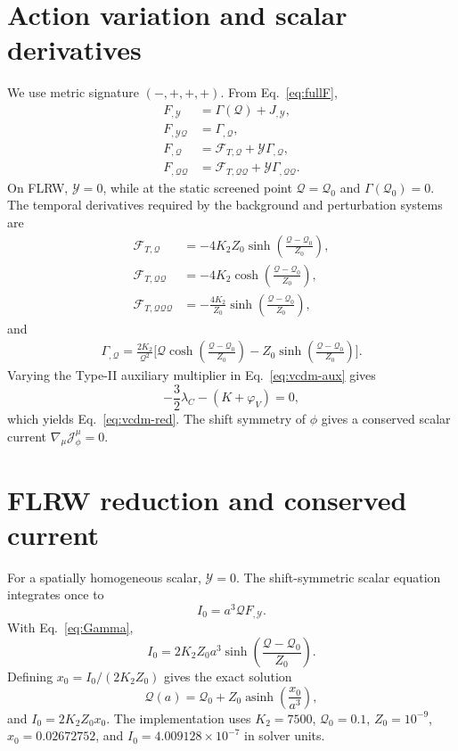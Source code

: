 \documentclass[aps,prd,twocolumn,superscriptaddress,nofootinbib,longbibliography,floatfix]{revtex4-2}
\newcommand{\Y}{\mathcal{Y}}
\newcommand{\Q}{\mathcal{Q}}
\begin{document}
\section{Action variation and scalar derivatives}\label{app:action}
We use metric signature $(-,+,+,+)$. From Eq.~\eqref{eq:fullF},
\begin{align}
F_{,\Y}&=\Gamma(\Q)+J_{,\Y},\\
F_{,\Y\Q}&=\Gamma_{,\Q},\\
F_{,\Q}&=\mathcal F_{T,\Q}+\Y\Gamma_{,\Q},\\
F_{,\Q\Q}&=\mathcal F_{T,\Q\Q}+\Y\Gamma_{,\Q\Q}.
\end{align}
On FLRW, $\Y=0$, while at the static screened point $\Q=\Q_0$ and $\Gamma(\Q_0)=0$. The temporal derivatives required by the background and perturbation systems are
\begin{align}
\mathcal F_{T,\Q}&=-4K_2Z_0\sinh\left(\frac{\Q-\Q_0}{Z_0}\right),\\
\mathcal F_{T,\Q\Q}&=-4K_2\cosh\left(\frac{\Q-\Q_0}{Z_0}\right),\\
\mathcal F_{T,\Q\Q\Q}&=-\frac{4K_2}{Z_0}\sinh\left(\frac{\Q-\Q_0}{Z_0}\right),
\end{align}
and
\begin{align}
\Gamma_{,\Q}=\frac{2K_2}{\Q^2}\Bigg[\Q\cosh\left(\frac{\Q-\Q_0}{Z_0}\right)
-Z_0\sinh\left(\frac{\Q-\Q_0}{Z_0}\right)\Bigg].
\end{align}
Varying the Type-II auxiliary multiplier in Eq.~\eqref{eq:vcdm-aux} gives
\begin{equation}
-\frac32\lambda_C-(K+\varphi_V)=0,
\end{equation}
which yields Eq.~\eqref{eq:vcdm-red}. The shift symmetry of $\phi$ gives a conserved scalar current $\nabla_\mu\mathcal J_\phi^\mu=0$.

\section{FLRW reduction and conserved current}\label{app:flrw}
For a spatially homogeneous scalar, $\Y=0$. The shift-symmetric scalar equation integrates once to
\begin{equation}
I_0=a^3\Q F_{,\Y}.
\label{eq:current}
\end{equation}
With Eq.~\eqref{eq:Gamma},
\begin{equation}
I_0=2K_2Z_0a^3\sinh\left(\frac{\Q-\Q_0}{Z_0}\right).
\end{equation}
Defining $x_0=I_0/(2K_2Z_0)$ gives the exact solution
\begin{equation}
\Q(a)=\Q_0+Z_0\operatorname{asinh}\left(\frac{x_0}{a^3}\right),
\label{eq:Qa}
\end{equation}
and $I_0=2K_2Z_0x_0$. The implementation uses $K_2=7500$, $\Q_0=0.1$, $Z_0=10^{-9}$, $x_0=0.02672752$, and $I_0=4.009128\times10^{-7}$ in solver units.
\end{document}
